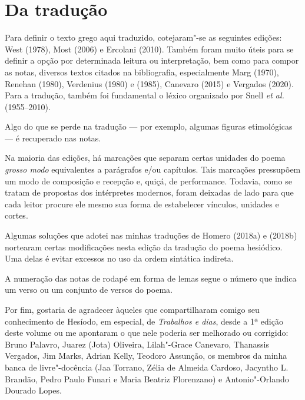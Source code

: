 \section{Da tradução}

Para definir o texto grego aqui traduzido, cotejaram"-se as seguintes
edições: West (1978), Most (2006) e Ercolani (2010). Também foram muito
úteis para se definir a opção por determinada leitura ou interpretação,
bem como para compor as notas, diversos textos citados na bibliografia,
especialmente Marg (1970), Renehan (1980), Verdenius (1980) e (1985),
Canevaro (2015) e Vergados (2020). Para a tradução, também foi
fundamental o léxico organizado por Snell \emph{et al.} (1955--2010).

Algo do que se perde na tradução --- por exemplo, algumas figuras
etimológicas --- é recuperado nas notas.

Na maioria das edições, há marcações que separam certas unidades do
poema \emph{grosso modo} equivalentes a parágrafos e/ou capítulos. Tais
marcações pressupõem um modo de composição e recepção e, quiçá, de
performance. Todavia, como se tratam de propostas dos intérpretes
modernos, foram deixadas de lado para que cada leitor procure ele mesmo
sua forma de estabelecer vínculos, unidades e cortes.

Algumas soluções que adotei nas minhas traduções de Homero (2018a) e
(2018b) nortearam certas modificações nesta edição da tradução do poema
hesiódico. Uma delas é evitar excessos no uso da ordem sintática
indireta.

A numeração das notas de rodapé em forma de lemas segue o número que
indica um verso ou um conjunto de versos do poema.

Por fim, gostaria de agradecer àqueles que compartilharam comigo seu
conhecimento de Hesíodo, em especial, de \emph{Trabalhos e dias}, desde
a 1ª edição deste volume ou me apontaram o que nele poderia ser
melhorado ou corrigido: Bruno Palavro, Juarez (Jota) Oliveira,
Lilah"-Grace Canevaro, Thanassis Vergados, Jim Marks, Adrian Kelly,
Teodoro Assunção, os membros da minha banca de livre"-docência (Jaa
Torrano, Zélia de Almeida Cardoso, Jacyntho L. Brandão, Pedro Paulo
Funari e Maria Beatriz Florenzano) e Antonio"-Orlando Dourado Lopes.


